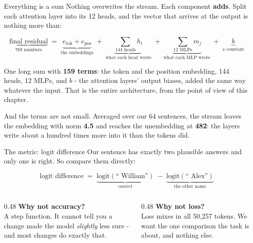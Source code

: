 \documentclass[aspectratio=169]{beamer}
\begin{document}
\begin{frame}{Everything is a sum}
  \vspace{0.8em}
  Nothing overwrites the stream. Each component \textbf{adds}. Split each attention layer into its
  12 heads, and the vector that arrives at the output is nothing more than:

  \vspace{0.8em}
  \[
    \underbrace{\text{final residual}}_{\text{768 numbers}} \;=\;
    \underbrace{e_{\text{tok}} + e_{\text{pos}}}_{\text{the embeddings}} \;+\;
    \underbrace{\sum_{\text{144 heads}} h_i}_{\text{what each head wrote}} \;+\;
    \underbrace{\sum_{\text{12 MLPs}} m_j}_{\text{what each MLP wrote}} \;+\;
    \underbrace{b}_{\text{a constant}}
  \]

  \vspace{0.6em}
  One long sum with \textbf{159 terms}: the token and the position embedding, 144 heads, 12 MLPs,
  and $b$ - the attention layers' output biases, added the same way whatever the input. That is
  the entire architecture, from the point of view of this chapter.

  \vspace{0.5em}
  And the terms are not small. Averaged over our 64 sentences, the stream leaves the embedding
  with norm \textbf{4.5} and reaches the unembedding at \textbf{482}: the layers write about a
  hundred times more into it than the tokens did.
\end{frame}

\begin{frame}{The metric: logit difference}
  \vspace{0.7em}
  Our sentence has exactly two plausible answers and only one is right. So compare them
  directly:

  \vspace{0.7em}
  \[
    \text{logit difference} \;=\;
      \underbrace{\text{logit}(\text{`` William''})}_{\text{correct}} \;-\;
      \underbrace{\text{logit}(\text{`` Alex''})}_{\text{the other name}}
  \]

  \vspace{1.0em}
  \begin{columns}[T]
    \begin{column}{0.48\textwidth}
      \textbf{Why not accuracy?}\\[0.3em]
      \small A step function. It cannot tell you a change made the model \emph{slightly} less
      sure - and most changes do exactly that.
    \end{column}
    \begin{column}{0.48\textwidth}
      \textbf{Why not loss?}\\[0.3em]
      \small Loss mixes in all 50{,}257 tokens. We want the one comparison the task is about,
      and nothing else.
    \end{column}
  \end{columns}
\end{frame}
\end{document}
